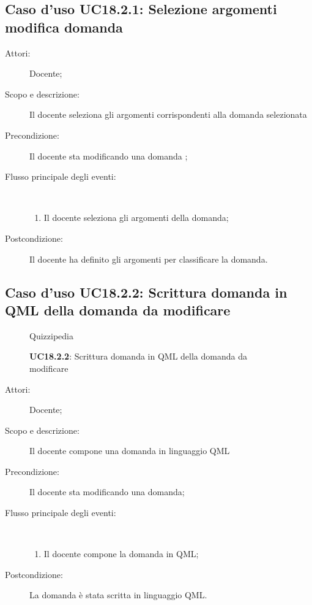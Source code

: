 \subsection{Caso d'uso UC18.2.1: Selezione argomenti modifica domanda}\begin{description}
	\item[Attori:] Docente;
	\item[Scopo e descrizione:] Il docente seleziona gli argomenti corrispondenti alla domanda selezionata
	\item[Precondizione:] Il docente sta modificando una domanda
	;
	
	\item[Flusso principale degli eventi:] \ 
	\begin{enumerate}
		\item Il docente seleziona gli argomenti della domanda;
		
	\end{enumerate}
	\item[Postcondizione:] Il docente ha definito gli argomenti per classificare la domanda.
\end{description}
\hypertarget{UC18.2.2}{}
\subsection{Caso d'uso UC18.2.2: Scrittura domanda in QML della domanda da modificare}
\begin{figure}[H]
	\centering
	\begin{resizedtikzpicture}{\textwidth}
		\begin{umlsystem}[x=0, fill=lightgray!20]{Quizzipedia}
			\umlassoc{Docente}{164}
			\umlinherit{165}{164}
		\end{umlsystem}
	\end{resizedtikzpicture}
	\caption{\textbf{UC18.2.2}: Scrittura domanda in QML della domanda da modificare}
	\label{UC18.2.2}
\end{figure}
\begin{description}
	\item[Attori:] Docente;
	\item[Scopo e descrizione:] Il docente compone una domanda in linguaggio QML
	\item[Precondizione:] Il docente sta modificando una domanda;
	
	\item[Flusso principale degli eventi:] \ 
	\begin{enumerate}
		\item Il docente compone la domanda in QML;
		
	\end{enumerate}
	\item[Postcondizione:] La domanda è stata scritta in linguaggio QML.
\end{description}
\hypertarget{UC18.2.3}{}
